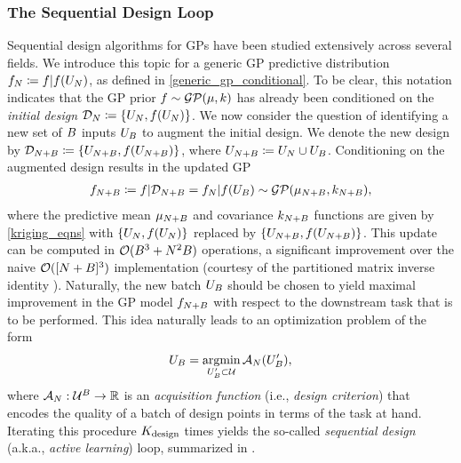 \documentclass[12pt]{article}
\begin{document}
\subsubsection{The Sequential Design Loop}
Sequential design algorithms for GPs have been studied extensively across several fields. We introduce this topic 
for a generic GP predictive distribution $\funcEm[\Ndesign] \Def \func|\func(\designIn)$, as defined in 
\ref{generic_gp_conditional}. To be clear, this notation indicates that the GP prior 
$\func \sim \GP(\gpMeanPrior, \gpKerPrior)$ has already been conditioned on the \textit{initial design}
$\design[\Ndesign] \Def \{\designIn, \func(\designIn)\}$. We now consider the question of identifying a new set of $\Nbatch$
inputs $\designBatchIn$ to augment the initial design. We denote the new design by 
$\design[\Naugment] \Def \{\designIn[\Naugment], \func(\designIn[\Naugment])\}$, where 
 $\designIn[\Naugment] \Def \designIn \cup \designBatchIn$. 
Conditioning on the augmented design results in the updated GP
\begin{align}
\funcEm[\Naugment] \Def \func|\design[\Naugment] = \funcEm[\Ndesign] | \func(\designIn[\Nbatch])   \sim \GP(\gpMean[\Naugment], \gpKer[\Naugment]),
\end{align}
where the predictive mean $\gpMean[\Naugment]$ and covariance $\gpKer[\Naugment]$ functions are given by \ref{kriging_eqns}
with $\{\designIn, \func(\designIn)\}$ replaced by $\{\designIn[\Naugment], \func(\designIn[\Naugment])\}$. This update 
can be computed in $\BigO(\Nbatch^3 + \Ndesign^2 \Nbatch)$ operations, a significant improvement over the naive $\BigO([\Ndesign + \Nbatch]^3)$
implementation (courtesy of the partitioned matrix inverse identity ). 
Naturally, the new batch $\designBatchIn$ should be chosen to 
yield maximal improvement in the GP model $\funcEm[\Naugment]$ with respect to the downstream task that is to be performed. 
This idea naturally leads to an optimization problem of the form 
\begin{align}
\designBatchIn = \argmin_{\designBatchIn^\prime \subset \parSpace} \acq[\Ndesign](\designBatchIn^\prime), \label{acq_func_opt}
\end{align}
where $\acq[\Ndesign]: \parSpace^{\Nbatch} \to \R$ is an \textit{acquisition function} (i.e., \textit{design criterion}) that 
encodes the quality of a batch of design points in terms of the task at hand. Iterating this procedure $\Nrounds$ times yields the so-called 
\textit{sequential design} (a.k.a., \textit{active learning}) loop, summarized in .  
\end{document}
